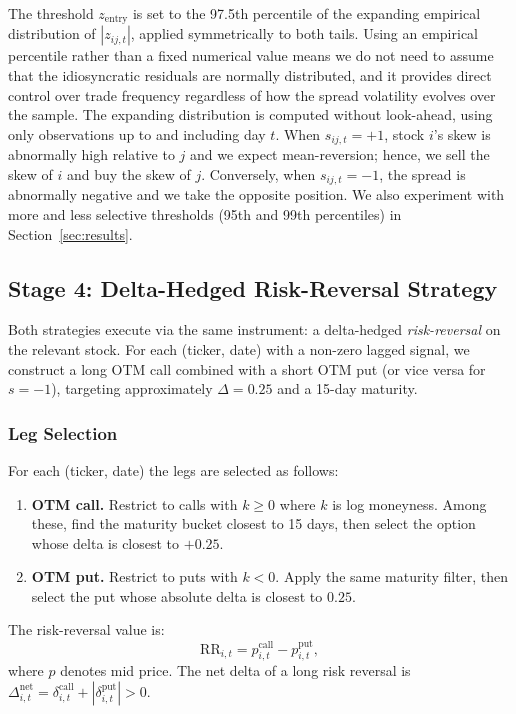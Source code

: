\documentclass[12pt, a4paper]{article}
\begin{document}
The threshold $z_{\mathrm{entry}}$ is set to the 97.5th percentile of the expanding empirical distribution of $|z_{ij,t}|$, applied symmetrically to both tails. Using an empirical percentile rather than a fixed numerical value means we do not need to assume that the idiosyncratic residuals are normally distributed, and it provides direct control over trade frequency regardless of how the spread volatility evolves over the sample. The expanding distribution is computed without look-ahead, using only observations up to and including day $t$. When $s_{ij,t} = +1$, stock $i$'s skew is abnormally high relative to $j$ and we expect mean-reversion; hence, we sell the skew of $i$ and buy the skew of $j$. Conversely, when $s_{ij,t} = -1$, the spread is abnormally negative and we take the opposite position. We also experiment with more and less selective thresholds (95th and 99th percentiles) in Section~\ref{sec:results}.

\subsection{Stage 4: Delta-Hedged Risk-Reversal Strategy}
\label{sec:option_strat}
Both strategies execute via the same instrument: a delta-hedged \emph{risk-reversal} on the relevant stock. For each (ticker, date) with a non-zero lagged signal, we construct a long OTM call combined with a short OTM put (or vice versa for $s = -1$), targeting approximately $\Delta = 0.25$ and a 15-day maturity.

\subsubsection{Leg Selection}
For each (ticker, date) the legs are selected as follows:
\begin{enumerate}
    \item \textbf{OTM call.} Restrict to calls with $k \geq 0$ where $k$ is log moneyness. Among these, find the maturity bucket closest to 15 days, then select the option whose delta is closest to $+0.25$. 
    \item \textbf{OTM put.} Restrict to puts with $k < 0$. Apply the same maturity filter, then select the put whose absolute delta is closest to $0.25$.
\end{enumerate}

The risk-reversal value is:
\begin{equation}
    \mathrm{RR}_{i,t} = p^{\mathrm{call}}_{i,t} - p^{\mathrm{put}}_{i,t},
    \label{eq:rr_value}
\end{equation}
where $p$ denotes mid price. The net delta of a long risk reversal is $\Delta^{\mathrm{net}}_{i,t} = \delta^{\mathrm{call}}_{i,t} + |\delta^{\mathrm{put}}_{i,t}| > 0$.
\end{document}

